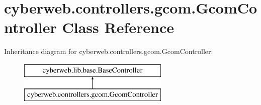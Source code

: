 \hypertarget{classcyberweb_1_1controllers_1_1gcom_1_1_gcom_controller}{\section{cyberweb.\-controllers.\-gcom.\-Gcom\-Controller \-Class \-Reference}
\label{classcyberweb_1_1controllers_1_1gcom_1_1_gcom_controller}
}
\-Inheritance diagram for cyberweb.\-controllers.\-gcom.\-Gcom\-Controller\-:\begin{figure}[H]
\begin{center}
\leavevmode
\includegraphics[height=2.000000cm]{classcyberweb_1_1controllers_1_1gcom_1_1_gcom_controller}
\end{center}
\end{figure}
